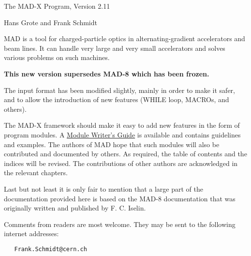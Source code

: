 
\begin{center}
\centerline{The MAD-X Program, Version 2.11}  
Hans Grote and Frank Schmidt 
\end{center}

MAD is a tool for charged-particle optics in alternating-gradient
accelerators and beam lines. It can handle very large and very small
accelerators and solves various problems on such machines.  

\textbf{{ This new version supersedes MAD-8 which has been frozen.}}

The input format has been modified slightly, mainly in order to make it
safer, and to allow the introduction of new features (WHILE loop,
MACROs, and others).  

The MAD-X framework should make it easy to add new features in the form
of program modules. A \href{module_doc.html}{ Module Writer's Guide} is
available and contains guidelines and examples. The authors of MAD hope
that such modules will also be contributed and documented by others. As
required, the table of contents and the indices will be revised. The
contributions of other authors are acknowledged in the relevant
chapters.  

Last but not least it is only fair to mention that a large part of the
documentation provided here is based on the MAD-8 documentation that was
originally written and published by F. C. Iselin.  

Comments from readers are most welcome. They may be sent to the following internet addresses: 
\begin{verbatim}
   Frank.Schmidt@cern.ch
\end{verbatim}


